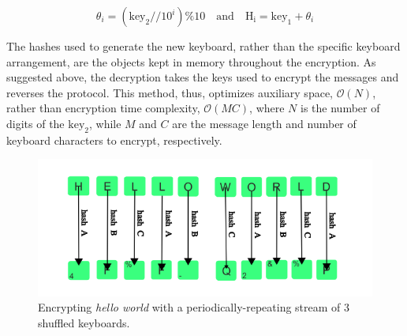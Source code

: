 \documentclass{article}
\begin{document}
\[
\theta_i =  (\mathrm{key_2} // 10^{i}) \% 10 \quad \mathrm{and} \quad \mathrm{H_i} = \mathrm{key_1}  + \theta_i
\]

The hashes used to generate the new keyboard, rather than the specific keyboard arrangement, are the objects kept in memory throughout the encryption. As suggested above, the decryption takes the keys used to encrypt the messages and reverses the protocol. This method, thus, optimizes auxiliary space, $\mathcal{O}(N)$, rather than encryption time complexity, $\mathcal{O}(MC)$, where $N$ is the number of digits of the $\mathrm{key_2}$, while $M$ and $C$ are the message length and number of keyboard characters to encrypt, respectively.

\begin{figure}[h]
  \centering
  \includegraphics[width=0.7\linewidth]{img/helloworld.png}
  \caption{Encrypting \textit{hello world} with a periodically-repeating stream of 3 shuffled keyboards.}
  \label{fig:helloworld}
\end{figure}
\end{document}
